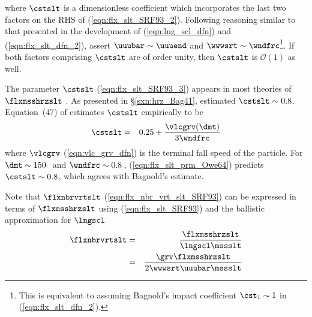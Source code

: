 \documentclass[12pt,twoside]{book}
\begin{document}
where $\cstslt$ is a dimensionless coefficient which incorporates the
last two factors on the RHS of (\ref{eqn:flx_slt_SRF93_2}). 
Following reasoning similar to that presented in the development of
(\ref{eqn:lng_scl_dfn}) and (\ref{eqn:flx_slt_dfn_2}), \cite{SRF93}
assert $\uuubar \sim \uuuend$ and $\wwwsrt \sim \wndfrc$\footnote{ 
This is equivalent to assuming Bagnold's impact coefficient 
$\cst_{1} \sim 1$ in (\ref{eqn:flx_slt_dfn_2}).}.
If both factors comprising $\cstslt$ are of order unity, then $\cstslt$ is
$\mathcal{O}(1)$ as well.

The parameter $\cstslt$ (\ref{eqn:flx_slt_SRF93_3}) appears in most
theories of $\flxmsshrzslt$ \cite[e.g.,][p.~100]{GrI85}. 
As presented in \S\ref{sxn:hrz_Bag41}, \cite{Bag41} estimated
$\cstslt \sim 0.8$. 
Equation~(47) of \cite{Owe64} estimates $\cstslt$ empirically to be 
\begin{eqnarray}
\cstslt & = & 0.25 + \frac{\vlcgrv (\dmt)}{3 \wndfrc} 
\label{eqn:flx_slt_prm_Owe64}
\end{eqnarray}
where $\vlcgrv$ (\ref{eqn:vlc_grv_dfn}) is the terminal fall speed of
the particle.  
For $\dmt \sim 150$\,\um\ and $\wndfrc \sim 0.8$\,\mxs,
(\ref{eqn:flx_slt_prm_Owe64}) predicts $\cstslt \sim 0.8$, 
which agrees with Bagnold's estimate.

Note that $\flxnbrvrtslt$ (\ref{eqn:flx_nbr_vrt_slt_SRF93}) can be
expressed in terms of $\flxmsshrzslt$ using (\ref{eqn:flx_slt_SRF93}) and
the ballistic approximation for $\lngscl$   
\begin{eqnarray}
\flxnbrvrtslt & = & \frac{\flxmsshrzslt}{\lngscl \mssslt } \nonumber \\
& = & \frac{\grv \flxmsshrzslt}{2 \wwwsrt \uuubar \mssslt }
\label{eqn:flx_nbr_vrt_slt_SRF93_2}
\end{eqnarray}
\end{document}
